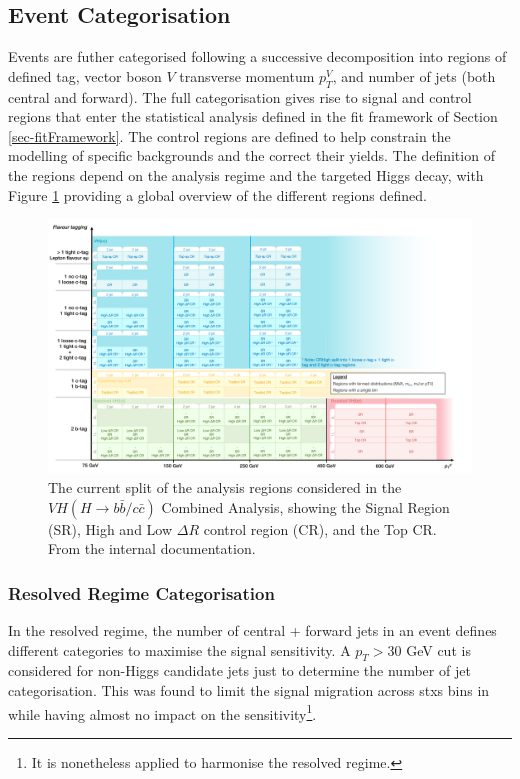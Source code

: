 \subsection{Event Categorisation}\label{sec-eventCat}
Events are futher categorised following a successive decomposition into regions of defined tag, vector boson $V$ transverse momentum $p_T^V$, and number of jets (both central and forward). The full categorisation gives rise to signal and control regions that enter the statistical analysis defined in the fit framework of Section \ref{sec-fitFramework}. The control regions are defined to help constrain the modelling of specific backgrounds and the correct their yields. The definition of the regions depend on the analysis regime and the targeted Higgs decay, with Figure \ref{fig:ana-strat-det} providing a global overview of the different regions defined.

\newpage

\begin{figure}
    \centering
    \includegraphics[width=\textwidth]{Images/VH/Cat/VH_analysis_cat.pdf}
    \caption{The current split of the analysis regions considered in the $VH (H\rightarrow b\bar{b}/c\bar{c})$ Combined Analysis, showing the Signal Region (SR), High and Low $\Delta R$ control region (CR), and the Top CR. From the internal documentation.} 
    \label{fig:ana-strat-det}
\end{figure}

\subsubsection{Resolved Regime Categorisation}
In the resolved regime, the number of central + forward jets in an event defines different categories to maximise the signal sensitivity. A $p_T > 30$ GeV cut is considered for non-Higgs candidate jets just to determine the number of jet categorisation. This was found to limit the signal migration across \gls{stxs} bins in \vhb while having almost no impact on the \vhc sensitivity\footnote{It is nonetheless applied to harmonise the resolved regime.}. 

